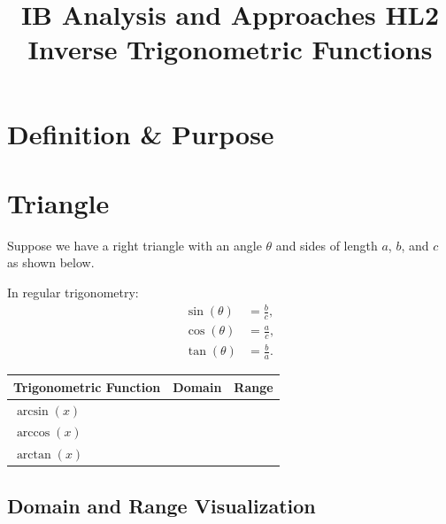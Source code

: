 \documentclass{article}
\title{\textbf{IB Analysis and Approaches HL2 \\ Inverse Trigonometric Functions}}
\author{}
\date{}
\begin{document}
\maketitle

\section*{Definition \& Purpose}

\begin{tcolorbox}[colback=white, colframe=sectioncolor!50, width=\textwidth, height=2in, valign=center, halign=left]
\end{tcolorbox}

\section*{Triangle}
Suppose we have a right triangle with an angle $\theta$ and sides of length $a$, $b$, and $c$ as shown below.

\begin{center}
\end{center}

In regular trigonometry:
\begin{align*}
\sin(\theta) &= \frac{b}{c}, \\
\cos(\theta) &= \frac{a}{c}, \\
\tan(\theta) &= \frac{b}{a}.
\end{align*}

\begin{center}
\begin{tabular}{|p{}|p{}|p{}|}
\hline
\rowcolor{tableheadercolor}
\textbf{Trigonometric Function} & \textbf{Domain} & \textbf{Range} \\
\hline
$\arcsin(x)$ & & \\
\hline
$\arccos(x)$ & & \\
\hline
$\arctan(x)$ & & \\
\hline
\end{tabular}
\end{center}

\subsection*{Domain and Range Visualization}
\end{document}
